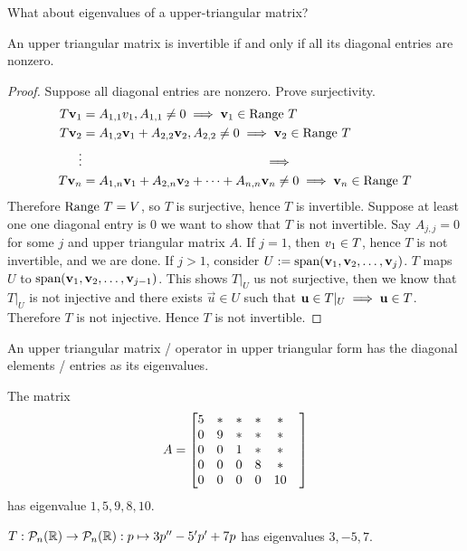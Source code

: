 \begin{question}
    What about eigenvalues of a upper-triangular matrix?
\end{question}
\begin{theorem}
    An upper triangular matrix is invertible if and only if all its diagonal entries are nonzero.
\end{theorem}
\begin{proof}
    Suppose all diagonal entries are nonzero. Prove surjectivity. 
    \begin{align*}
        T\vec v_1  &=A_{1,1} v_1, A_{1,1} \neq 0 \implies \vec v_1 \in \range T\\
     T\vec v_2  &=A_{1,2} \vec v_1 + A_{2,2} \vec v_2 , A_{2,2} \neq 0 \implies \vec v_2 \in \range T \\
     \vdots & \hspace{5cm} \implies \\
     T\vec v_n &= A_{1,n} \vec v_1 + A_{2,n} \vec v_2 + \cdots + A_{n,n} \vec v_n \neq 0 \implies \vec v_n \in \range T
    \end{align*} 
    Therefore $\text{Range } T = V$, so $T$ is surjective, hence $T$ is invertible. 
    Suppose at least one one diagonal entry is $0$ we want to show that $T$ is not invertible. Say $A_{j,j} = 0$ for some $j$ and upper triangular matrix $A$. If $j = 1$, then $v_1 \in \null T$, hence $T$ is not invertible, and we are done. If $j > 1$, consider $U := \text{span} ({\mathbf v}_1,{\mathbf v}_2, \ldots, {\mathbf v}_{j})$. $T$ maps $U$ to $\text{span} ({\mathbf v}_1,{\mathbf v}_2, \ldots, {\mathbf v}_{j-1})$. This shows $T|_U$ us not surjective, then we know that $T|_U$ is not injective and there exists $\vec u \in U$ such that $\vec u \in \null T|_U \implies \vec u \in \null T$. Therefore $T$ is not injective. Hence $T$ is not invertible.
\end{proof}
\begin{corollary}
    An upper triangular matrix / operator in upper triangular form has the diagonal elements / entries as its eigenvalues.
\end{corollary}
\begin{example}The matrix
    \[ A = \begin{bmatrix} 
5 & * & * & * & * & \\
0 & 9 & * & * & * & \\
0 & 0 & 1 & * & * & \\
0 & 0 & 0 & 8 & * & \\
0 & 0 & 0 & 0 & 10 & \\
\end{bmatrix}\]
has eigenvalue $1,5,9,8,10$.
\end{example}
\begin{example}
    $T: \mathcal P_n(\mathbb R) \to \mathcal P_n(\mathbb R) : p \mapsto 3p'' - 5'p' + 7p$ has eigenvalues $3,-5,7$.
\end{example}
